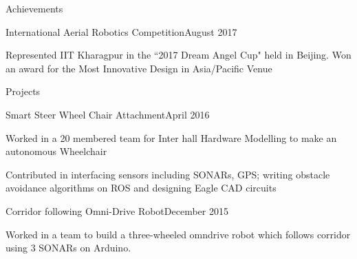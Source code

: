\documentclass{resume} %
\begin{document}
\begin{rSection}{Achievements}

\begin{rSubsection}{International Aerial Robotics Competition}{August 2017}{}{}
\item Represented IIT Kharagpur in the ``2017 Dream Angel Cup" held in Beijing. Won an award for the Most Innovative Design in Asia/Pacific Venue
\end{rSubsection}


\end{rSection}

\begin{rSection}{Projects}

\begin{rSubsection}{Smart Steer Wheel Chair Attachment}{April 2016}{}{}
\item Worked in a 20 membered team for Inter hall Hardware Modelling to make an autonomous Wheelchair
\item Contributed in interfacing sensors including SONARs, GPS; writing obstacle avoidance algorithms on ROS and designing Eagle CAD circuits
\end{rSubsection}

\begin{rSubsection}{Corridor following Omni-Drive Robot}{December 2015}{}{}
\item Worked in a team to build a three-wheeled omndrive robot which follows corridor using 3 SONARs on Arduino.
\end{rSubsection}





\end{rSection}
\end{document}
